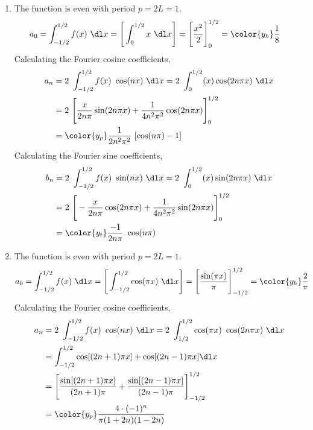 \begin{enumerate}
    \item The function is even with period $ p = 2L = 1 $.
          \begin{align}
              a_0 & = \int_{-1/2}^{1/2} f(x)\ \dl x
              = \Bigg[\int_{0}^{1/2} x\ \dl x \Bigg]
              = \Bigg[ \frac{x^2}{2} \Bigg]_{0}^{1/2}
              = \color{y_h} \frac{1}{8}
          \end{align}
          Calculating the Fourier cosine coefficients,
          \begin{align}
              a_n & = 2\ \int_{-1/2}^{1/2} f(x)\ \cos(nx)\ \dl x
              = 2\ \int_{0}^{1/2} (x) \cos(2n\pi x)\ \dl x              \\
                  & = 2\ \Bigg[ \frac{x}{2n \pi} \sin(2n\pi x)
              + \frac{1}{4n^2 \pi^2} \cos(2n\pi x) \Bigg]_{0}^{1/2}     \\
                  & = \color{y_p} \frac{1}{2n^2\pi^2}\ [\cos(n\pi) - 1]
          \end{align}
          Calculating the Fourier sine coefficients,
          \begin{align}
              b_n & = 2\ \int_{-1/2}^{1/2} f(x)\ \sin(nx)\ \dl x
              = 2\ \int_{0}^{1/2} (x) \sin(2n\pi x)\ \dl x          \\
                  & = 2\ \Bigg[ -\frac{x}{2n \pi} \cos(2n\pi x)
              + \frac{1}{4n^2 \pi^2} \sin(2n\pi x) \Bigg]_{0}^{1/2} \\
                  & = \color{y_t} \frac{-1}{2n\pi}\ \cos(n\pi)
          \end{align}

    \item The function is even with period $ p = 2L = 1 $.
          \begin{align}
              a_0 & = \int_{-1/2}^{1/2} f(x)\ \dl x
              = \Bigg[\int_{-1/2}^{1/2} \cos(\pi x)\ \dl x \Bigg]
              = \Bigg[ \frac{\sin(\pi x)}{\pi} \Bigg]_{-1/2}^{1/2}
              = \color{y_h} \frac{2}{\pi}
          \end{align}
          Calculating the Fourier cosine coefficients,
          \begin{align}
              a_n & = 2\ \int_{-1/2}^{1/2} f(x)\ \cos(nx)\ \dl x
              = 2\ \int_{1/2}^{1/2} \cos(\pi x)\ \cos(2n\pi x)\ \dl x         \\
                  & = \int_{-1/2}^{1/2} \cos[(2n+1)\pi x]
              + \cos[(2n-1)\pi  x] \dl x                                      \\
                  & = \Bigg[ \frac{\sin[(2n+1)\pi x]}{(2n+1)\pi}
              + \frac{\sin[(2n-1)\pi x]}{(2n-1)\pi}  \Bigg]_{-1/2}^{1/2}      \\
                  & = \color{y_p} \frac{4 \cdot (-1)^n }{\pi(1 + 2n)(1 - 2n)}
          \end{align}


\end{enumerate}

